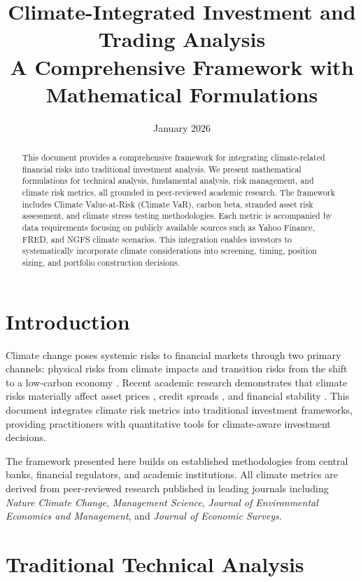 \documentclass[11pt,a4paper]{article}
\title{\textbf{Climate-Integrated Investment and Trading Analysis}\\
\large A Comprehensive Framework with Mathematical Formulations}
\author{}
\date{January 2026}
\begin{document}
\maketitle

\begin{abstract}
This document provides a comprehensive framework for integrating climate-related financial risks into traditional investment analysis. We present mathematical formulations for technical analysis, fundamental analysis, risk management, and climate risk metrics, all grounded in peer-reviewed academic research. The framework includes Climate Value-at-Risk (Climate VaR), carbon beta, stranded asset risk assessment, and climate stress testing methodologies. Each metric is accompanied by data requirements focusing on publicly available sources such as Yahoo Finance, FRED, and NGFS climate scenarios. This integration enables investors to systematically incorporate climate considerations into screening, timing, position sizing, and portfolio construction decisions.
\end{abstract}

\tableofcontents
\newpage

\section{Introduction}

Climate change poses systemic risks to financial markets through two primary channels: physical risks from climate impacts and transition risks from the shift to a low-carbon economy \citep{NGFS2024, BaselCommittee2021}. Recent academic research demonstrates that climate risks materially affect asset prices \citep{Campiglio2023}, credit spreads \citep{Klusak2023}, and financial stability \citep{Battiston2017}. This document integrates climate risk metrics into traditional investment frameworks, providing practitioners with quantitative tools for climate-aware investment decisions.

The framework presented here builds on established methodologies from central banks, financial regulators, and academic institutions. All climate metrics are derived from peer-reviewed research published in leading journals including \textit{Nature Climate Change}, \textit{Management Science}, \textit{Journal of Environmental Economics and Management}, and \textit{Journal of Economic Surveys}.

\section{Traditional Technical Analysis}
\end{document}

